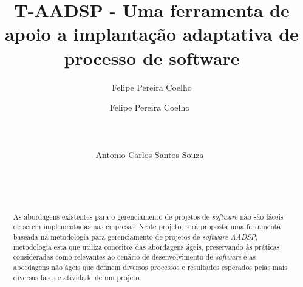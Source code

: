 \documentclass{acm_proc_article-sp}
\author{Felipe Pereira Coelho}
\begin{document}
\title{ T-AADSP - Uma ferramenta de apoio a implantação adaptativa de processo de software}

\author{
%
%
\alignauthor
Felipe Pereira Coelho\ \\
       \\
       \\
       \\
\alignauthor
Antonio Carlos Santos Souza\ \\
       \\
       \\
       \\
}


\maketitle
\begin{abstract}
As abordagens existentes para o gerenciamento de projetos de \textit{software} não são fáceis de serem implementadas nas empresas. Neste projeto, será proposta uma ferramenta baseada na metodologia para gerenciamento de projetos de \textit{software} \textit{AADSP}, metodologia esta que utiliza conceitos das abordagens ágeis, preservando às práticas consideradas como relevantes ao cenário de desenvolvimento de \textit{software} e as abordagens não ágeis que definem diversos processos e resultados esperados pelas mais diversas fases e atividade de um projeto. 
\end{abstract}

\end{document}
